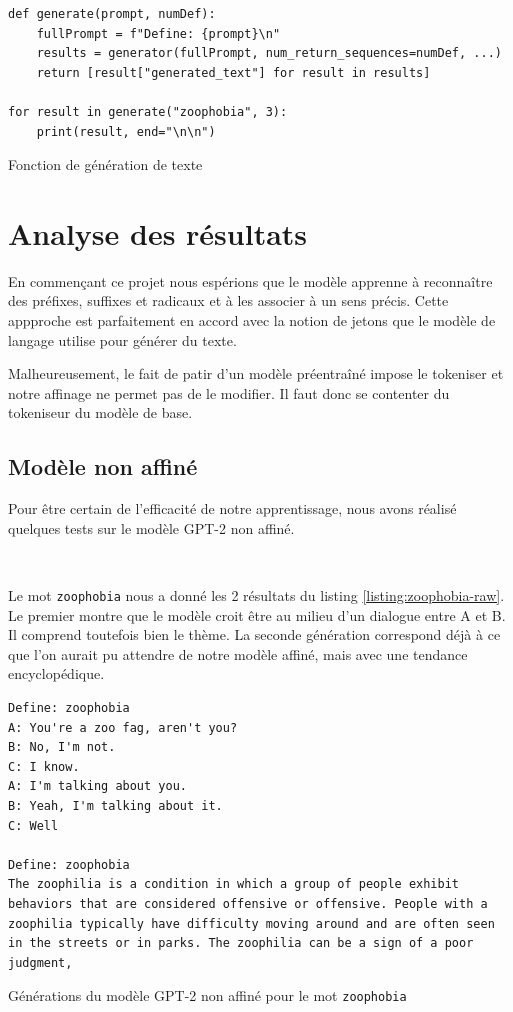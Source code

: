 \documentclass[french]{template}
\begin{document}
\begin{listing}[H]
    \begin{verbatim}
def generate(prompt, numDef):
    fullPrompt = f"Define: {prompt}\n"
    results = generator(fullPrompt, num_return_sequences=numDef, ...)
    return [result["generated_text"] for result in results]

for result in generate("zoophobia", 3):
    print(result, end="\n\n")
    \end{verbatim}
    \caption{Fonction de génération de texte}
    \label{listing:generate}
\end{listing}

\section{Analyse des résultats}

En commençant ce projet nous espérions que le modèle apprenne à reconnaître des préfixes, suffixes et radicaux et à les associer à un sens précis. Cette appproche est parfaitement en accord avec la notion de jetons que le modèle de langage utilise pour générer du texte.

Malheureusement, le fait de patir d'un modèle préentraîné impose le tokeniser et notre affinage ne permet pas de le modifier. Il faut donc se contenter du tokeniseur du modèle de base.

\subsection{Modèle non affiné}

Pour être certain de l'efficacité de notre apprentissage, nous avons réalisé quelques tests sur le modèle GPT-2 non affiné.

\

Le mot \texttt{zoophobia} nous a donné les 2 résultats du listing \ref{listing:zoophobia-raw}. Le premier montre que le modèle croit être au milieu d'un dialogue entre A et B. Il comprend toutefois bien le thème. La seconde génération correspond déjà à ce que l'on aurait pu attendre de notre modèle affiné, mais avec une tendance encyclopédique.

\begin{listing}[H]
    \begin{verbatim}
Define: zoophobia
A: You're a zoo fag, aren't you?
B: No, I'm not.
C: I know.
A: I'm talking about you.
B: Yeah, I'm talking about it.
C: Well

Define: zoophobia
The zoophilia is a condition in which a group of people exhibit behaviors that are considered offensive or offensive. People with a zoophilia typically have difficulty moving around and are often seen in the streets or in parks. The zoophilia can be a sign of a poor judgment,
    \end{verbatim}
    \caption{Générations du modèle GPT-2 non affiné pour le mot \texttt{zoophobia}}
    \label{listing:zoophobia-raw}
\end{listing}
\end{document}

